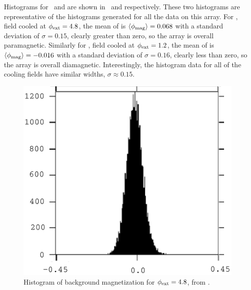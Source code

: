 Histograms for \ and  
are shown in 
\ and  
respectively. These two histograms
are representative of the histograms generated for all the data on 
this array. For , field cooled
at $\phi_{\mathrm{ext}} = 4.8$, the mean of  is 
$\langle\phi_{\mathrm{mag}}\rangle = 0.068$ with a standard deviation of 
$\sigma = 0.15$,
clearly
greater than zero, so the array is overall paramagnetic. Similarly for
, field cooled at $\phi_{\mathrm{ext}} = 1.2$, 
the mean of  is 
$\langle\phi_{\mathrm{mag}}\rangle= -0.016$ with a standard deviation of 
$\sigma = 0.16$,
clearly less than
zero, so the array is overall diamagnetic. 
Interestingly, the histogram data for all of the cooling fields have similar
widths, $\sigma \approx 0.15$. 

%
%

\begin{figure}[p]
\includegraphics[width=5.7in]{figs/pme_exp/fig3_7_a_lg.ps}
\caption{Histogram of background magnetization for $\phi_{\mathrm{ext}} = 4.8$, from
.}
\label{fig:hist_background_a}
\end{figure}

